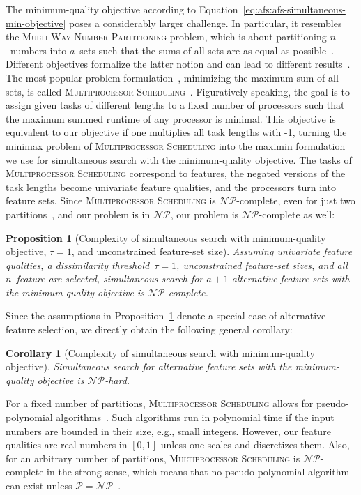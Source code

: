 \documentclass{article}
\newtheorem{corollary}{Corollary}
\newtheorem{proposition}{Proposition} %
\theoremstyle{definition}
\begin{document}
The minimum-quality objective according to Equation~\ref{eq:afs:afs-simultaneous-min-objective} poses a considerably larger challenge.
In particular, it resembles the \textsc{Multi-Way Number Partitioning} problem, which is about partitioning $n$~numbers into $a$~sets such that the sums of all sets are as equal as possible~\cite{korf2010objective}.
Different objectives formalize the latter notion and can lead to different results~\cite{korf2010objective}.
The most popular problem formulation~\cite{lawrinenko2018reduction, walter2017improved}, minimizing the maximum sum of all sets, is called \textsc{Multiprocessor Scheduling}~\cite{garey2003computers}.
Figuratively speaking, the goal is to assign given tasks of different lengths to a fixed number of processors such that the maximum summed runtime of any processor is minimal.
This objective is equivalent to our objective if one multiplies all task lengths with -1, turning the minimax problem of \textsc{Multiprocessor Scheduling} into the maximin formulation we use for simultaneous search with the minimum-quality objective.
The tasks of \textsc{Multiprocessor Scheduling} correspond to features, the negated versions of the task lengths become univariate feature qualities, and the processors turn into feature sets. 
Since \textsc{Multiprocessor Scheduling} is $\mathcal{NP}$-complete, even for just two partitions~\cite{garey2003computers}, and our problem is in $\mathcal{NP}$, our problem is $\mathcal{NP}$-complete as well:
%
\begin{proposition}[Complexity of simultaneous search with minimum-quality objective, $\tau=1$, and unconstrained feature-set size]
	Assuming univariate feature qualities, a dissimilarity threshold~$\tau = 1$, unconstrained feature-set sizes, and all $n$~feature are selected, simultaneous search for $a+1$ alternative feature sets with the minimum-quality objective is $\mathcal{NP}$-complete.
	\label{prop:afs:complexity-partitioning-min-variable-k}
\end{proposition}
%
Since the assumptions in Proposition~\ref{prop:afs:complexity-partitioning-min-variable-k} denote a special case of alternative feature selection, we directly obtain the following general corollary:
%
\begin{corollary}[Complexity of simultaneous search with minimum-quality objective]
	Simultaneous search for alternative feature sets with the minimum-quality objective is $\mathcal{NP}$-hard.
\end{corollary}
%
For a fixed number of partitions, \textsc{Multiprocessor Scheduling} allows for pseudo-polynomial algorithms~\cite{garey2003computers}.
Such algorithms run in polynomial time if the input numbers are bounded in their size, e.g., small integers.
However, our feature qualities are real numbers in $[0,1]$ unless one scales and discretizes them.
Also, for an arbitrary number of partitions, \textsc{Multiprocessor Scheduling} is $\mathcal{NP}$-complete in the strong sense, which means that no pseudo-polynomial algorithm can exist unless $\mathcal{P}=\mathcal{NP}$~\cite{garey2003computers}.
\end{document}
